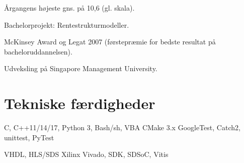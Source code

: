 \documentclass[a4paper]{janus-resume}
\begin{document}
\begin{minipage}[t]{0.49\textwidth}
\sectionspace %

Årgangens højeste gns. på 10,6 (gl. skala).
\begin{tightitemize}
\item Bachelorprojekt: Rentestrukturmodeller. \\
\item McKinsey Award og Legat 2007 (førstepræmie for bedste resultat på bacheloruddannelsen). \\
\item Udveksling på Singapore Management University. \\
\end{tightitemize}

\sectionspace %




\sectionspace %


\section{Tekniske færdigheder}


C, C++11/14/17, Python 3, Bash/sh, VBA
\bluebullet{} CMake 3.x 
\bluebullet {} GoogleTest, Catch2,
 unittest, PyTest \\
\sectionspace %

VHDL, HLS/SDS 
\bluebullet{} Xilinx Vivado, SDK, SDSoC, Vitis
\sectionspace %


\end{minipage}
\end{document}
